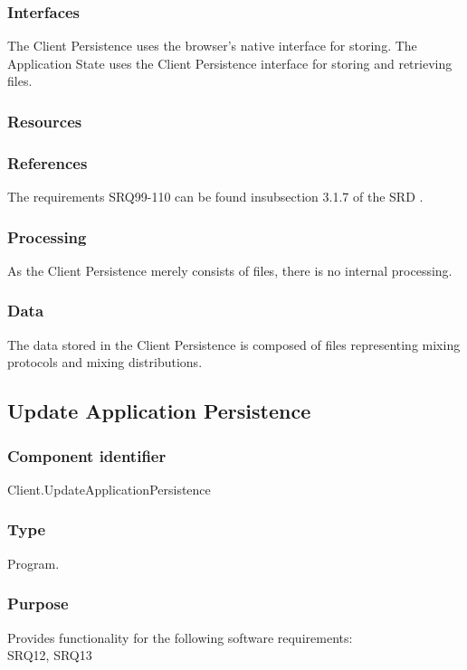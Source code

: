 \subsubsection*{Interfaces}
The Client Persistence uses the browser's native interface for storing. The Application State uses the Client Persistence interface for storing and retrieving files.

\subsubsection*{Resources}

\subsubsection*{References}
The requirements SRQ99-110 can be found insubsection 3.1.7 of the SRD \cite{srd}.

\subsubsection*{Processing}
As the Client Persistence merely consists of files, there is no internal processing.

\subsubsection*{Data}
The data stored in the Client Persistence is composed of files representing mixing protocols and mixing distributions.

\subsection{Update Application Persistence}

\subsubsection*{Component identifier}
Client.UpdateApplicationPersistence

\subsubsection*{Type}
Program.

\subsubsection*{Purpose}
Provides functionality for the following software requirements:\\
SRQ12, SRQ13

